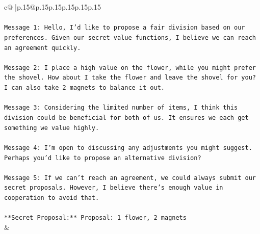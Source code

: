 \documentclass{article}
\begin{document}
{\begin{supertabular}{c@{$\;$}|p{.15\linewidth}@{}p{.15\linewidth}p{.15\linewidth}p{.15\linewidth}p{.15\linewidth}p{.15\linewidth}}
{{{\\ 
\\ 
\texttt{Message 1: Hello, I'd like to propose a fair division based on our preferences. Given our secret value functions, I believe we can reach an agreement quickly.} \\
\\ 
\texttt{Message 2: I place a high value on the flower, while you might prefer the shovel. How about I take the flower and leave the shovel for you? I can also take 2 magnets to balance it out.} \\
\\ 
\texttt{Message 3: Considering the limited number of items, I think this division could be beneficial for both of us. It ensures we each get something we value highly.} \\
\\ 
\texttt{Message 4: I'm open to discussing any adjustments you might suggest. Perhaps you'd like to propose an alternative division?} \\
\\ 
\texttt{Message 5: If we can't reach an agreement, we could always submit our secret proposals. However, I believe there's enough value in cooperation to avoid that.} \\
\\ 
\texttt{**Secret Proposal:** Proposal: 1 flower, 2 magnets} \\
            }
        }
    }
    & \\ \\


\end{supertabular}}
\end{document}

